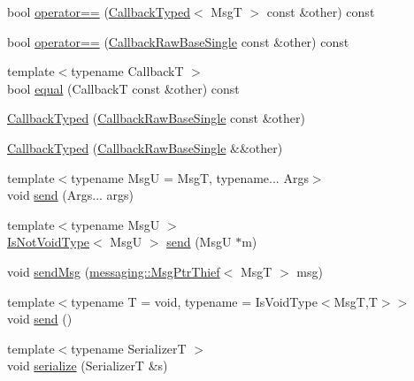 \begin{DoxyCompactItemize}
\item 
bool \hyperlink{structvt_1_1pipe_1_1callback_1_1cbunion_1_1_callback_typed_a6b88345f0d05d52a67730ffecaf68917}{operator==} (\hyperlink{structvt_1_1pipe_1_1callback_1_1cbunion_1_1_callback_typed}{Callback\+Typed}$<$ MsgT $>$ const \&other) const
\item 
bool \hyperlink{structvt_1_1pipe_1_1callback_1_1cbunion_1_1_callback_typed_a8ce2b5aa8087f7ff59e90c92d4d48c0f}{operator==} (\hyperlink{structvt_1_1pipe_1_1callback_1_1cbunion_1_1_callback_raw_base_single}{Callback\+Raw\+Base\+Single} const \&other) const
\item 
{\footnotesize template$<$typename CallbackT $>$ }\\bool \hyperlink{structvt_1_1pipe_1_1callback_1_1cbunion_1_1_callback_typed_a2c1b0eea2a4e14dc85a6ab889bd6a644}{equal} (CallbackT const \&other) const
\item 
\hyperlink{structvt_1_1pipe_1_1callback_1_1cbunion_1_1_callback_typed_a3cb4289b3d7353d03fcdfb6d7c52bb7a}{Callback\+Typed} (\hyperlink{structvt_1_1pipe_1_1callback_1_1cbunion_1_1_callback_raw_base_single}{Callback\+Raw\+Base\+Single} const \&other)
\item 
\hyperlink{structvt_1_1pipe_1_1callback_1_1cbunion_1_1_callback_typed_a51d3fdb7b8b73d077a76d79a52343794}{Callback\+Typed} (\hyperlink{structvt_1_1pipe_1_1callback_1_1cbunion_1_1_callback_raw_base_single}{Callback\+Raw\+Base\+Single} \&\&other)
\item 
{\footnotesize template$<$typename MsgU  = MsgT, typename... Args$>$ }\\void \hyperlink{structvt_1_1pipe_1_1callback_1_1cbunion_1_1_callback_typed_ad4cfe4ed3a311c21a596ca5d97bc8858}{send} (Args... args)
\item 
{\footnotesize template$<$typename MsgU $>$ }\\\hyperlink{structvt_1_1pipe_1_1callback_1_1cbunion_1_1_callback_typed_a57e15e61b171c50bff2e7a0dd9078f46}{Is\+Not\+Void\+Type}$<$ MsgU $>$ \hyperlink{structvt_1_1pipe_1_1callback_1_1cbunion_1_1_callback_typed_afdbf535b3210a84aaaeae0b9b3edc35f}{send} (MsgU $\ast$m)
\item 
void \hyperlink{structvt_1_1pipe_1_1callback_1_1cbunion_1_1_callback_typed_afd8456a0ee9a572847f65a7f24c10a66}{send\+Msg} (\hyperlink{structvt_1_1messaging_1_1_msg_ptr_thief}{messaging\+::\+Msg\+Ptr\+Thief}$<$ MsgT $>$ msg)
\item 
{\footnotesize template$<$typename T  = void, typename  = Is\+Void\+Type$<$\+Msg\+T,\+T$>$$>$ }\\void \hyperlink{structvt_1_1pipe_1_1callback_1_1cbunion_1_1_callback_typed_aa118972d857f12ec7433e01440b2dfd3}{send} ()
\item 
{\footnotesize template$<$typename SerializerT $>$ }\\void \hyperlink{structvt_1_1pipe_1_1callback_1_1cbunion_1_1_callback_typed_adf664b7850b5c89afd0abdac51bba0ed}{serialize} (SerializerT \&s)
\end{DoxyCompactItemize}
